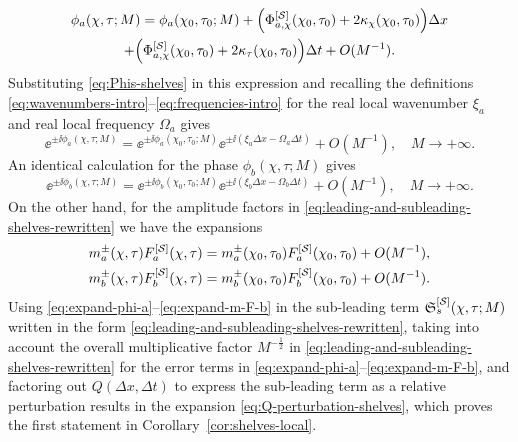 \begin{multline}
\phi_a(\chi,\tau;M) = \phi_a(\chi_0,\tau_0; M) + \left(\Phi^{[\shelves]}_{a,\chi}(\chi_0,\tau_0) + 2\kappa_\chi(\chi_0,\tau_0) \right)\Delta x \\ + \left( \Phi^{[\shelves]}_{a,\chi}(\chi_0,\tau_0) + 2\kappa_\tau(\chi_0,\tau_0) \right) \Delta t + O(M^{-1}).
\end{multline}
Substituting \eqref{eq:Phis-shelves} in this expression and recalling the definitions  \eqref{eq:wavenumbers-intro}--\eqref{eq:frequencies-intro} for the real local wavenumber $\xi_a$ and real local frequency $\Omega_a$ gives
\begin{equation}
\ee^{\pm \ii \phi_a(\chi,\tau;M)} = \ee^{\pm \ii \phi_a(\chi_0,\tau_0;M)} \ee^{\pm \ii (\xi_a \Delta x - \Omega_a \Delta t)} + O(M^{-1}),\quad M\to +\infty.
\label{eq:expand-phi-a}
\end{equation}
An identical calculation for the phase $\phi_b(\chi,\tau;M)$ gives
\begin{equation}
\ee^{\pm \ii \phi_b(\chi,\tau;M)} = \ee^{\pm \ii \phi_b(\chi_0,\tau_0;M)} \ee^{\pm \ii (\xi_b \Delta x - \Omega_b \Delta t)} + O(M^{-1}),\quad M\to +\infty.
\label{eq:expand-phi-b}
\end{equation}
On the other hand, for the amplitude factors in \eqref{eq:leading-and-subleading-shelves-rewritten} we have the expansions 
\begin{align}
m_a^{\pm}(\chi,\tau)F_a^{[\mathcal{S}]}(\chi,\tau)&=  m_a^{\pm}(\chi_0,\tau_0)F_a^{[\mathcal{S}]}(\chi_0,\tau_0) + O(M^{-1}),\label{eq:expand-m-F-a}\\
m_b^{\pm}(\chi,\tau)F_b^{[\mathcal{S}]}(\chi,\tau)&=  m_b^{\pm}(\chi_0,\tau_0)F_b^{[\mathcal{S}]}(\chi_0,\tau_0) + O(M^{-1})\label{eq:expand-m-F-b}.
\end{align}
Using \eqref{eq:expand-phi-a}--\eqref{eq:expand-m-F-b} in the sub-leading term $\mathfrak{S}_s^{[\mathcal{S}]}(\chi,\tau;M)$ written in the form \eqref{eq:leading-and-subleading-shelves-rewritten}, taking into account the overall multiplicative factor $M^{-\frac{1}{2}}$ in \eqref{eq:leading-and-subleading-shelves-rewritten} for the error terms in \eqref{eq:expand-phi-a}--\eqref{eq:expand-m-F-b}, and factoring out $Q(\Delta x, \Delta t)$ to express the sub-leading term as a relative perturbation results in the expansion \eqref{eq:Q-perturbation-shelves}, which proves the first statement in Corollary~\ref{cor:shelves-local}.

